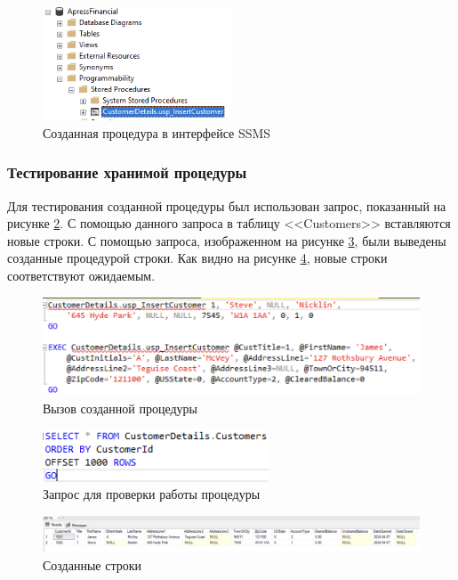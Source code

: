 \documentclass[a4paper, 14pt]{extarticle}
\begin{document}
\begin{figure}[H]
  \centering
  \includegraphics[width=0.5\textwidth]{images/task-1/6.png}
  \caption{Созданная процедура в интерфейсе SSMS}
  \label{fig:task-1-6}
\end{figure}

\subsubsection{Тестирование хранимой процедуры}

Для тестирования созданной процедуры был использован запрос, показанный на
рисунке \ref{fig:task-1-7}. С помощью данного запроса в таблицу
<<\foreignlanguage{english}{Customers}>> вставляются новые строки. С помощью
запроса, изображенном на рисунке \ref{fig:task-1-8}, были выведены созданные
процедурой строки. Как видно на рисунке \ref{fig:task-1-9}, новые строки
соответствуют ожидаемым.

\begin{figure}[H]
  \centering
  \includegraphics[width=\textwidth]{images/task-1/7.png}
  \caption{Вызов созданной процедуры}
  \label{fig:task-1-7}
\end{figure}

\begin{figure}[H]
  \centering
  \includegraphics[width=0.6\textwidth]{images/task-1/8.png}
  \caption{Запрос для проверки работы процедуры}
  \label{fig:task-1-8}
\end{figure}

\begin{figure}[H]
  \centering
  \includegraphics[width=\textwidth]{images/task-1/9.png}
  \caption{Созданные строки}
  \label{fig:task-1-9}
\end{figure}
\end{document}
